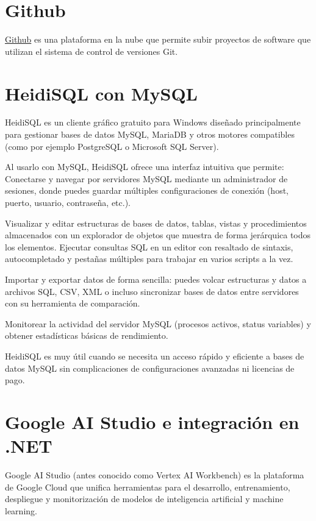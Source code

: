 
\section{Github}\label{github}
\href{https://github.com/}{Github} es una plataforma en la nube que permite subir proyectos de software que utilizan el sistema de control de versiones Git. 


\section{HeidiSQL con MySQL}\label{heidi-sql}
HeidiSQL es un cliente gráfico gratuito para Windows diseñado principalmente para gestionar bases de datos MySQL, MariaDB y otros motores compatibles (como por ejemplo PostgreSQL o Microsoft SQL Server). 


Al usarlo con MySQL, HeidiSQL ofrece una interfaz intuitiva que permite:
Conectarse y navegar por servidores MySQL mediante un administrador de sesiones, donde puedes guardar múltiples configuraciones de conexión (host, puerto, usuario, contraseña, etc.).

Visualizar y editar estructuras de bases de datos, tablas, vistas y procedimientos almacenados con un explorador de objetos que muestra de forma jerárquica todos los elementos.
Ejecutar consultas SQL en un editor con resaltado de sintaxis, autocompletado y pestañas múltiples para trabajar en varios scripts a la vez.

Importar y exportar datos de forma sencilla: puedes volcar estructuras y datos a archivos SQL, CSV, XML o incluso sincronizar bases de datos entre servidores con su herramienta de comparación.

Monitorear la actividad del servidor MySQL (procesos activos, status variables) y obtener estadísticas básicas de rendimiento.


HeidiSQL es muy útil cuando se necesita un acceso rápido y eficiente a bases de datos MySQL sin complicaciones de configuraciones avanzadas ni licencias de pago.

\section{Google AI Studio e integración en .NET}\label{google-ai-studio}
Google AI Studio (antes conocido como Vertex AI Workbench) es la plataforma de Google Cloud que unifica herramientas para el desarrollo, entrenamiento, despliegue y monitorización de modelos de inteligencia artificial y machine learning. 

